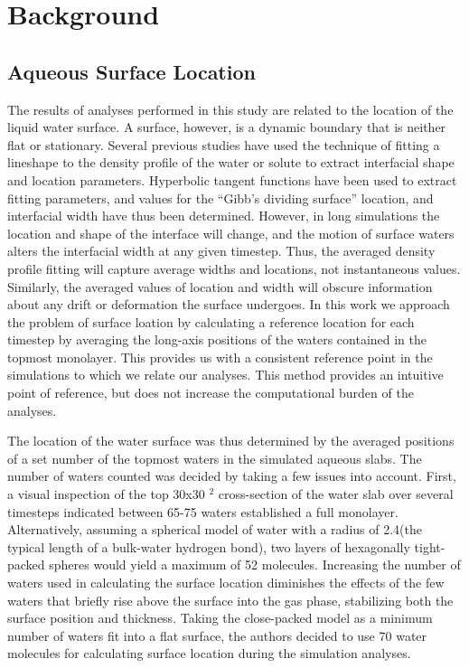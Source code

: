 \section{Background}

\subsection {Aqueous Surface Location}

	The results of analyses performed in this study are related to the location of the liquid water surface. A surface, however, is a dynamic boundary that is neither flat or stationary. Several previous studies have used the technique of fitting a lineshape to the density profile of the water or solute to extract interfacial shape and location parameters.\cite{Shamay2010,Wick2006c,Chowdhary2006} Hyperbolic tangent functions have been used to extract fitting parameters, and values for the ``Gibb's dividing surface'' location, and interfacial width have thus been determined.\cite{Matsumoto1988} However, in long simulations the location and shape of the interface will change, and the motion of surface waters alters the interfacial width at any given timestep. Thus, the averaged density profile fitting will capture average widths and locations, not instantaneous values. Similarly, the averaged values of location and width will obscure information about any drift or deformation the surface undergoes. In this work we approach the problem of surface loation by calculating a reference location for each timestep by averaging the long-axis positions of the waters contained in the topmost monolayer. This provides us with a consistent reference point in the simulations to which we relate our analyses. This method provides an intuitive point of reference, but does not increase the computational burden of the analyses.

  The location of the water surface was thus determined by the averaged positions of a set number of the topmost waters in the simulated aqueous slabs. The number of waters counted was decided by taking a few issues into account. First, a visual inspection of the top 30x30 \angs$^2$ cross-section of the water slab over several timesteps indicated between 65-75 waters established a full monolayer. Alternatively, assuming a spherical model of water with a radius of 2.4\angs (the typical length of a bulk-water hydrogen bond), two layers of hexagonally tight-packed spheres would yield a maximum of 52 molecules. Increasing the number of waters used in calculating the surface location diminishes the effects of the few waters that briefly rise above the surface into the gas phase, stabilizing both the surface position and thickness. Taking the close-packed model as a minimum number of waters fit into a flat surface, the authors decided to use 70 water molecules for calculating surface location during the simulation analyses.
  
